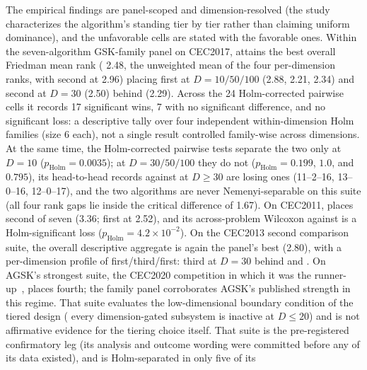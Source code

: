 The empirical findings are panel-scoped and dimension-resolved (the
study characterizes the algorithm's standing tier by tier rather than
claiming uniform dominance), and the unfavorable cells are stated with
the favorable ones. Within the seven-algorithm GSK-family panel
on CEC2017, \dtgsk{} attains the best overall Friedman mean rank (%
2.48, the unweighted mean of the four per-dimension ranks, with
\egsk{} second at 2.96) placing first at $D = 10/50/100$ (2.88,
2.21, 2.34) and second at $D = 30$ (2.50) behind \egsk{}
(2.29). %
Across the 24 Holm-corrected pairwise cells it records 17 significant
wins, 7 with no significant difference, and no significant loss: a
descriptive tally over four independent within-dimension Holm families
(size 6 each), not a single result controlled family-wise across
dimensions. %
At the same time, the Holm-corrected pairwise tests separate the two only at
$D = 10$ ($p_{\mathrm{Holm}} = 0.0035$); at $D = 30/50/100$ they do not
($p_{\mathrm{Holm}} = 0.199$, $1.0$, and $0.795$), its head-to-head records
against \egsk{} at $D \geq 30$ are losing ones (11--2--16, 13--0--16,
12--0--17), and the two algorithms are never Nemenyi-separable on this suite
(all four rank gaps lie inside the critical difference of
1.67). %
On CEC2011, \dtgsk{} places second of seven (3.36; \egsk{} first at
2.52), and its across-problem Wilcoxon against \egsk{} is a
Holm-significant loss
($p_{\mathrm{Holm}} = 4.2 \times 10^{-2}$). %
On the CEC2013 second comparison suite, the overall descriptive
aggregate is again the panel's best (2.80), with a per-dimension
profile of first/third/first: third at $D = 30$ behind \egsk{} and
\atmals{}. %
On AGSK's strongest suite, the CEC2020 competition in which it was
the runner-up~\cite{mohamed2020agsk}, \dtgsk{} places fourth; the family
panel corroborates AGSK's published strength in this regime.  That suite
evaluates the low-dimensional boundary condition of the tiered design (
every dimension-gated \dtgsk{} subsystem is inactive at $D \leq 20$)
and is not affirmative evidence for the tiering choice itself. That suite is the pre-registered confirmatory
leg (its analysis and outcome wording were committed before any of
its data existed), and \dtgsk{} is Holm-separated in only five of its
